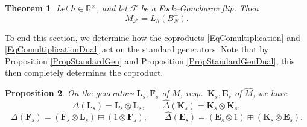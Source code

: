 \documentclass[11pt, reqno]{amsart}
\newtheorem{theorem}{Theorem}[section]
\newtheorem{prop}[theorem]{Proposition}
\theoremstyle{definition}
\numberwithin{equation}{section}
\def\R{\mathbb R}
\newcommand{\Fct}{\mathcal{F}}
\newcommand{\Bor}{B}
\newcommand{\Kb}{\mathbf{K}}
\newcommand{\Lb}{\mathbf{L}}
\def\stgE{\mathbf{E}}
\def\stgF{\mathbf{F}}
\begin{document}
\begin{theorem}\label{TheovNFGFlipOr}
Let $\hbar\in \R^{\times}$, and let $\Fct$ be a Fock--Goncharov flip. Then 
\[
M_{\Fct} = L_{\hbar}(\Bor_N^-).
\]
\end{theorem}

To end this section, we determine how the coproducts \eqref{EqComultiplication} and \eqref{EqComultiplicationDual} act on the standard generators. Note that by Proposition \ref{PropStandardGen}
 and Proposition \ref{PropStandardGenDual}, this then completely determines the coproduct.

\begin{prop} \label{Propstandardcoproducts}
On the generators $\Lb_s,\stgF_s$ of $M$, resp.\ $\Kb_s,\stgE_s$ of $\hat{M}$, we have 
\[
\Delta(\Lb_s) = \Lb_s \otimes \Lb_s,\qquad \hat{\Delta}(\Kb_s) = \Kb_s \otimes \Kb_s,
\]
\[
\Delta(\stgF_s) = (\stgF_s \otimes \Lb_s) \boxplus (1 \otimes \stgF_s),\qquad \hat{\Delta}(\stgE_s) = (\stgE_s \otimes 1)\boxplus (\Kb_s \otimes \stgE_s).
\]
\end{prop}
\end{document}
